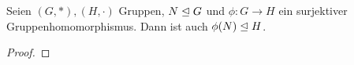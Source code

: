 \documentclass[../main.tex]{subfiles}
\begin{document}
\begin{lemma}\label{lem:found:5}
        Seien $(G,*), (H,\cdot)$ Gruppen, $N \trianglelefteq G$ und $\phi: G \rightarrow H$ ein surjektiver Gruppenhomomorphismus. Dann ist auch $\phi(N) \trianglelefteq H$.
\end{lemma}
    \begin{proof}
        \TODO
    \end{proof}
    
\end{document}

